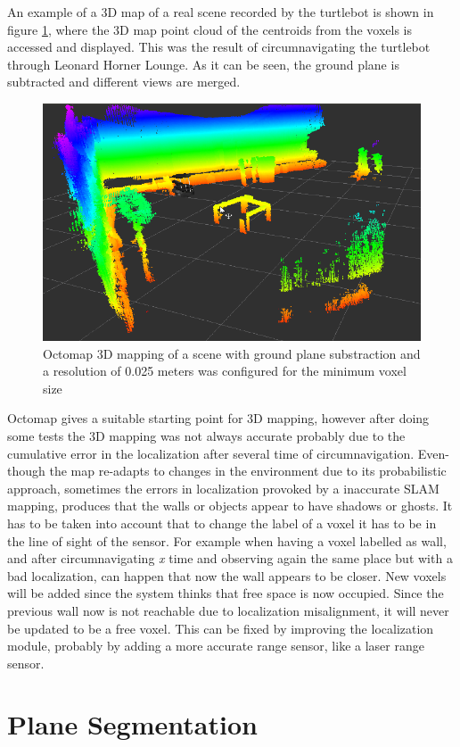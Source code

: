 \documentclass[fontsize=12pt]{article}
\begin{document}
An example of a 3D map of a real scene  recorded by the turtlebot is shown in figure \ref{fig:octoscene}, where the 3D map point cloud of the centroids from the voxels is accessed and displayed. This was the result of circumnavigating the turtlebot through Leonard Horner Lounge. As it can be seen, the ground plane is subtracted and different views are merged. 
\begin{figure}[H]
\begin{center}
\includegraphics[width=0.6\linewidth]{images/figoctomap}
\caption{Octomap 3D mapping of a scene with ground plane substraction and a resolution of 0.025 meters was configured for the minimum voxel size }
\label{fig:octoscene}
\end{center}
\end{figure}

Octomap gives a suitable starting point for 3D mapping, however after doing some tests the 3D mapping was not always accurate probably due to the cumulative error in the localization after several time of circumnavigation. Even-though the map re-adapts to changes in the environment due to its probabilistic approach, sometimes the  errors in localization provoked by a inaccurate SLAM mapping, produces that the walls or objects appear to have shadows or ghosts. It has to be taken into account that to change the label of a voxel it has to be in the line of sight of the sensor. For example when having a voxel labelled as wall, and after circumnavigating \textit{x} time and observing again  the same place but with a bad localization, can happen that now the wall appears to be closer. New voxels will be added since the system thinks that free space is now occupied. Since the previous wall now is not reachable due to localization misalignment, it will never be updated to be a free voxel. This can be fixed by improving the localization module, probably by adding a more accurate range sensor, like a laser range sensor. 

\section{Plane Segmentation}
\label{sec:plane_segmentation} 
\end{document}
